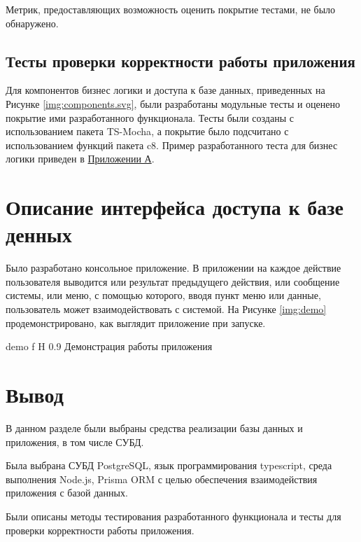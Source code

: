 Метрик, предоставляющих возможность оценить покрытие тестами, не было обнаружено.

\subsection{Тесты проверки корректности работы приложения}

Для компонентов бизнес логики и доступа к базе данных, приведенных на Рисунке \ref{img:components.svg}, были разработаны модульные тесты и оценено покрытие ими разработанного функционала. Тесты были созданы с использованием пакета TS-Mocha\cite{mocha}, а покрытие было подсчитано с использованием функций пакета c8\cite{c8}. 
Пример разработанного теста для бизнес логики приведен в \hyperref[chp:Appendix1]{Приложении А}.

\section{Описание интерфейса доступа к базе денных}

Было разработано консольное приложение. 
В приложении на каждое действие пользователя выводится или результат предыдущего действия, или сообщение системы, или меню, с помощью которого, вводя пункт меню или данные, пользователь может взаимодействовать с системой.
На Рисунке \ref{img:demo} продемонстрировано, как выглядит приложение при запуске.

{demo}
{f}
{H}
{0.9\textwidth}
{Демонстрация работы приложения}

\section*{Вывод}

В данном разделе были выбраны средства реализации базы данных и приложения, в том числе СУБД. 

Была выбрана СУБД  PostgreSQL, язык программирования typescript, среда выполнения Node.js, Prisma ORM с целью обеспечения взаимодействия приложения с базой данных.

Были описаны методы тестирования разработанного функционала и тесты для проверки корректности работы приложения.